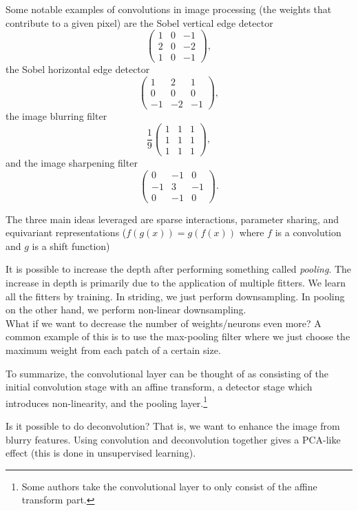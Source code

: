 \documentclass{article}
\begin{document}
		Some notable examples of convolutions in image processing (the weights that contribute to a given pixel) are the Sobel vertical edge detector
		\[
			\begin{pmatrix}
				1 & 0 & -1 \\
				2 & 0 & -2 \\
				1 & 0 & -1
			\end{pmatrix},
		\]
		the Sobel horizontal edge detector
		\[
			\begin{pmatrix}
				1 & 2 & 1 \\
				0 & 0 & 0 \\
				-1 & -2 & -1
			\end{pmatrix},
		\]
		the image blurring filter
		\[
			\frac{1}{9}
			\begin{pmatrix}
				1 & 1 & 1 \\
				1 & 1 & 1 \\
				1 & 1 & 1
			\end{pmatrix},
		\]
		and the image sharpening filter
		\[
			\begin{pmatrix}
				0 & -1 & 0 \\
				-1 & 3 & -1 \\
				0 & -1 & 0
			\end{pmatrix}.
		\]

		The three main ideas leveraged are sparse interactions, parameter sharing, and equivariant representations ($f(g(x)) = g(f(x))$ where $f$ is a convolution and $g$ is a shift function)

		It is possible to increase the depth after performing something called \emph{pooling}. The increase in depth is primarily due to the application of multiple fitters. We learn all the fitters by training. In striding, we just perform downsampling. In pooling on the other hand, we perform non-linear downsampling.\\
		What if we want to decrease the number of weights/neurons even more? A common example of this is to use the max-pooling filter where we just choose the maximum weight from each patch of a certain size.

		To summarize, the convolutional layer can be thought of as consisting of the initial convolution stage with an affine transform, a detector stage which introduces non-linearity, and the pooling layer.\footnote{Some authors take the convolutional layer to only consist of the affine transform part.} 

		Is it possible to do deconvolution? That is, we want to enhance the image from blurry features. Using convolution and deconvolution together gives a PCA-like effect (this is done in unsupervised learning).\\
\end{document}
